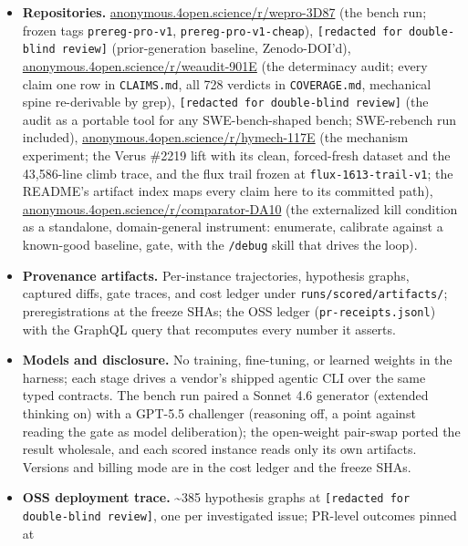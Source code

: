 \documentclass[
  10pt,
]{article}
\providecommand{\tightlist}{%
  \setlength{\itemsep}{0pt}\setlength{\parskip}{0pt}}
\begin{document}
\begin{itemize}
\tightlist
\item
  \textbf{Repositories.}
  \href{https://anonymous.4open.science/r/wepro-3D87}{anonymous.4open.science/r/wepro-3D87}
  (the bench run; frozen tags \texttt{prereg-pro-v1},
  \texttt{prereg-pro-v1-cheap}),
  \texttt{[redacted for double-blind review]}
  (prior-generation baseline, Zenodo-DOI'd),
  \href{https://anonymous.4open.science/r/weaudit-901E}{anonymous.4open.science/r/weaudit-901E}
  (the determinacy audit; every claim one row in \texttt{CLAIMS.md}, all
  728 verdicts in \texttt{COVERAGE.md}, mechanical spine re-derivable by
  grep),
  \texttt{[redacted for double-blind review]}
  (the audit as a portable tool for any SWE-bench-shaped bench;
  SWE-rebench run included),
  \href{https://anonymous.4open.science/r/hymech-117E}{anonymous.4open.science/r/hymech-117E}
  (the mechanism experiment; the Verus \#2219 lift with its clean,
  forced-fresh dataset and the 43,586-line climb trace, and the flux
  trail frozen at \texttt{flux-1613-trail-v1}; the README's artifact
  index maps every claim here to its committed path),
  \href{https://anonymous.4open.science/r/comparator-DA10}{anonymous.4open.science/r/comparator-DA10}
  (the externalized kill condition as a standalone, domain-general
  instrument: enumerate, calibrate against a known-good baseline, gate,
  with the \texttt{/debug} skill that drives the loop).
\item
  \textbf{Provenance artifacts.} Per-instance trajectories, hypothesis
  graphs, captured diffs, gate traces, and cost ledger under
  \texttt{runs/scored/artifacts/}; preregistrations at the freeze SHAs;
  the OSS ledger (\texttt{pr-receipts.jsonl}) with the GraphQL query
  that recomputes every number it asserts.
\item
  \textbf{Models and disclosure.} No training, fine-tuning, or learned
  weights in the harness; each stage drives a vendor's shipped agentic
  CLI over the same typed contracts. The bench run paired a Sonnet 4.6
  generator (extended thinking on) with a GPT-5.5 challenger (reasoning
  off, a point against reading the gate as model deliberation); the
  open-weight pair-swap ported the result wholesale, and each scored
  instance reads only its own artifacts. Versions and billing mode are
  in the cost ledger and the freeze SHAs.
\item
  \textbf{OSS deployment trace.} \textasciitilde385 hypothesis graphs at
  \texttt{[redacted for double-blind review]},
  one per investigated issue; PR-level outcomes pinned at

\end{itemize}
\end{document}
